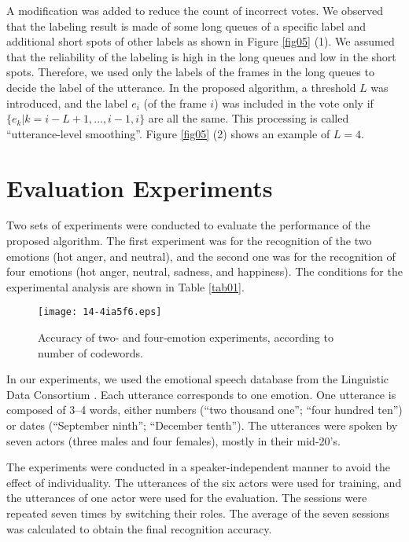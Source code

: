\documentclass[english]{jnlp_1.3e}
\begin{document}
A modification was added to reduce the count of incorrect votes. We observed that the labeling result is made of some long queues of a specific label and additional short spots of other labels as shown in Figure \ref{fig05} (1). We assumed that the reliability of the labeling is high in the long queues and low in the short spots. Therefore, we used only the labels of the frames in the long queues to decide the label of the utterance. In the proposed algorithm, a threshold $L$ was introduced, and the label $e_i$ (of the frame $i$) was included in the vote only if $\{e_k|k=i-L+1,\ldots,i-1,i\}$  are all the same. This processing is called ``utterance-level smoothing''. Figure \ref{fig05} (2) shows an example of $L=4$.


\section{Evaluation Experiments}

Two sets of experiments were conducted to evaluate the performance of the proposed algorithm. The first experiment was for the recognition of the two emotions (hot anger, and neutral), and the second one was for the recognition of four emotions (hot anger, neutral, sadness, and happiness). The conditions for the experimental analysis are shown in Table \ref{tab01}.

\begin{table}[b]

\end{table} 
\begin{figure}[b]
\begin{center}
    \texttt{[image: 14-4ia5f6.eps]}
\caption{Accuracy of two- and four-emotion experiments, according to number of codewords.}
\label{fig06}
\end{center}
\end{figure}


In our experiments, we used the emotional speech database from the Linguistic Data Consortium \cite{LDC2002}. Each utterance corresponds to one emotion. One utterance is composed of 3--4 words, either numbers (``two thousand one''; ``four hundred ten'') or dates (``September ninth''; ``December tenth''). The utterances were spoken by seven actors (three males and four females), mostly in their mid-20's.

The experiments were conducted in a speaker-independent manner to avoid the effect of individuality. The utterances of the six actors were used for training, and the utterances of one actor were used for the evaluation. The sessions were repeated seven times by switching their roles. The average of the seven sessions was calculated to obtain the final recognition accuracy.
\end{document}
